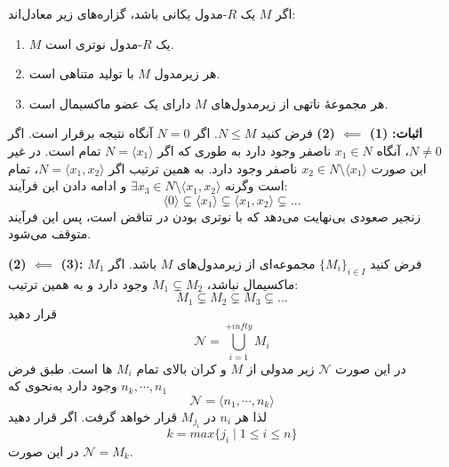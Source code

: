 \begin{frame}
    \begin{theorem}
        اگر $M$ یک $R$-مدول یکانی باشد، گزاره‌های زیر معادل‌اند:
        \begin{enumerate}
            \item $M$ یک $R$-مدول نوتری است.
            \item هر زیرمدول $M$ با تولید متناهی است.
            \item هر مجموعهٔ ناتهی از زیرمدول‌های $M$ دارای یک عضو ماکسیمال است.
        \end{enumerate}

    \end{theorem}
    \textbf{اثبات:} \textbf{(1) \(\impliedby \) (2)}
    فرض کنید $N \leq M$.
    اگر $N = 0$ آنگاه نتیجه برقرار است.
    اگر $N \neq 0$، آنگاه $ x_1 \in N$ ناصفر وجود دارد  به طوری که اگر
    \(N = \langle x_1 \rangle \) تمام است.
    در غیر این صورت $ x_2 \in N \setminus \langle x_1 \rangle$ ناصفر وجود دارد.
    به همین ترتیب اگر $N = \langle x_1, x_2 \rangle$، تمام است وگرنه $\exists x_3 \in N \setminus \langle x_1, x_2 \rangle$ و ادامه دادن این فرآیند:
    \[
        \langle 0 \rangle \subsetneq\langle x_1 \rangle \subsetneq \langle x_1, x_2 \rangle \subsetneq \dots
    \]
    زنجیر صعودی بی‌نهایت می‌دهد که با نوتری بودن در تناقض است، پس این فرآیند متوقف می‌شود.


\end{frame}




\begin{frame}

    \textbf{(2) \(\impliedby\) (3):}
    فرض کنید $\{ M_i \}_{i \in I}$ مجموعه‌ای از زیرمدول‌های $M$ باشد. اگر $M_1$ ماکسیمال نباشد، $M_1 \subsetneq M_2$ وجود دارد  و به همین ترتیب:
    \[
        M_1 \subsetneq M_2 \subsetneq M_3 \subsetneq \dots
    \]
    قرار دهید
    \[
        \mathcal{N} = \bigcup_{i=1}^{+infty} M_i
    \]
    در این صورت
    \(\mathcal{N}\)
    زیر مدولی از
    \(M\)
    و
    کران بالای تمام
    \(M_i\)
    ها است. طبق فرض
    \(n_k, \cdots , n_1\)
    وجود دارد به‌نحوی که
    \[
        \mathcal{N} = \langle n_1, \cdots , n_k \rangle
    \]
    لذا هر
    \(n_i\)
    در
    \(M_{j_i}\)
    قرار خواهد گرفت.
    اگر قرار دهید
    \[
        k = max\{j_i \mid 1 \leqslant i \leqslant n\}
    \]
    در این صورت
    \(\mathcal{N} = M_k\).





\end{frame}


